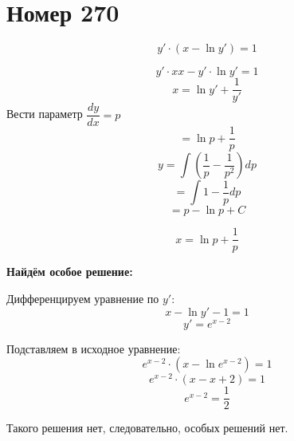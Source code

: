 \section*{Номер 270}
$$ y' \cdot (x - \ln y') = 1 $$

\begin{solution}
    $$ y' \cdot x x - y' \cdot \ln y' = 1 $$
    $$ x = \ln y' + \dfrac{1}{y'} $$
    Вести параметр $\dfrac{dy}{dx} = p$
    $$  = \ln p + \dfrac{1}{p} $$
    $$ y = \int \left( \frac{1}{p} - \frac{1}{p^2} \right) dp $$
    $$ = \int 1 - \frac{1}{p} dp $$
    $$ = p - \ln p + C $$
    
    $$ x = \ln p + \frac{1}{p} $$
    
    
    \textbf{Найдём особое решение:}
    
    Дифференцируем уравнение по $y'$:
    $$ x - \ln y' - 1 = 1 $$
    $$ y' = e^{x - 2} $$
    
    Подставляем в исходное уравнение:
    $$ e^{x - 2} \cdot (x - \ln e^{x - 2}) = 1 $$
    $$ e^{x - 2} \cdot (x - x + 2) = 1 $$
    $$ e^{x - 2} = \frac{1}{2} $$
    
    Такого решения нет, следовательно, особых решений нет.
\end{solution}
\pagebreak